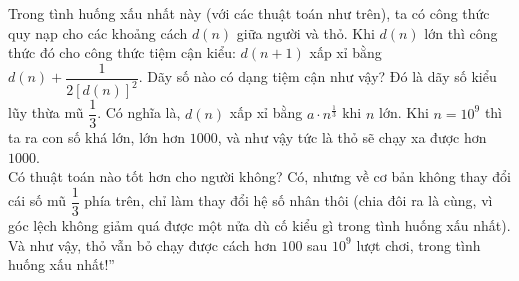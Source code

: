 \begin{bt}
{\begin{nx}
			Trong tình huống xấu nhất này (với các thuật toán như trên), ta có công thức quy nạp cho các khoảng cách $d(n)$ giữa người và thỏ. Khi $d(n)$ lớn thì công thức đó cho công thức tiệm cận kiểu: $d(n+1)$ xấp xỉ bằng $d(n)+\dfrac{1}{2\left[d(n)\right]^2}$. Dãy số nào có dạng tiệm cận như vậy? Đó là dãy số kiểu lũy thừa mũ $\dfrac{1}{3}$. Có nghĩa là, $d(n)$ xấp xỉ bằng $a\cdot n^{\frac{1}{3}}$ khi $n$ lớn. Khi $n=10^9$ thì ta ra con số khá lớn, lớn hơn $1000$, và như vậy tức là thỏ sẽ chạy xa được hơn $1000$.\\
			Có thuật toán nào tốt hơn cho người không? Có, nhưng về cơ bản không thay đổi cái số mũ $\dfrac{1}{3}$ phía trên, chỉ làm thay đổi hệ số nhân thôi (chia đôi ra là cùng, vì góc lệch không giảm quá được một nửa dù cố kiểu gì trong tình huống xấu nhất). Và như vậy, thỏ vẫn bỏ chạy được cách hơn $100$ sau $10^9$ lượt chơi, trong tình huống xấu nhất!''
		\end{nx}
	}
\end{bt}

